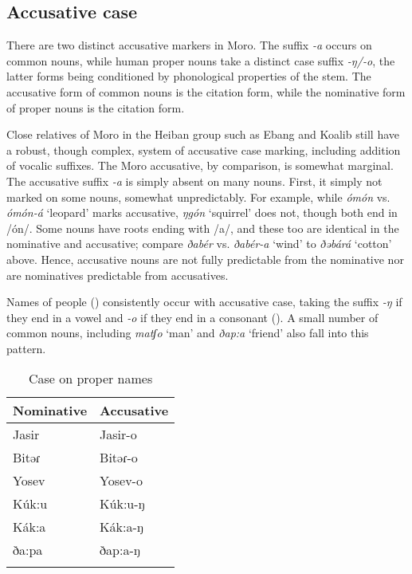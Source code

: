 \subsection{Accusative case}\label{section:accusative}

There are two distinct accusative markers in Moro. The suffix \textit{-a} occurs on common nouns, while human proper nouns take a distinct case suffix \textit{-ŋ/-o}, the latter forms being conditioned by phonological properties of the stem. The accusative form of common nouns is the citation form, while the nominative form of proper nouns is the citation form.

Close relatives of Moro in the Heiban group such as Ebang and Koalib still have a robust, though complex, system of accusative case marking, including addition of vocalic suffixes. The Moro accusative, by comparison, is somewhat marginal. The accusative suffix \textit{-a} is simply absent on many nouns. First, it simply not marked on some nouns, somewhat unpredictably. For example, while \textit{ómón} vs. \textit{ómón-á} `leopard' marks accusative, \textit{ŋgón} `squirrel' does not, though both end in /ón/. Some nouns have roots ending with /a/, and these too are identical in the nominative and accusative; compare \textit{ðabér} vs. \textit{ðabér-a} `wind' to \textit{ðəbárá} `cotton' above. Hence, accusative nouns are not fully predictable from the nominative nor are nominatives predictable from accusatives.

Names of people () consistently occur with accusative case, taking the suffix \textit{-ŋ} if they end in a vowel and \textit{-o} if they end in a consonant (). A small number of common nouns, including \textit{matʃo} `man' and \textit{ðap:a} `friend' also fall into this pattern.

\begin{table}
\begin{tabular}[t]{ll}
\lsptoprule
Nominative & Accusative\\
 \midrule 
 Jasir & Jasir-o \\
 Bitəɾ & Bitəɾ-o \\
 Yosev & Yosev-o \\
 Kúk:u & Kúk:u-ŋ \\  
 Kák:a & Kák:a-ŋ \\
 ða:pa & ðap:a-ŋ \\
\lspbottomrule
 \end{tabular}
\caption{Case on proper names}\label{tab:ch6:propacc}	
\end{table}

